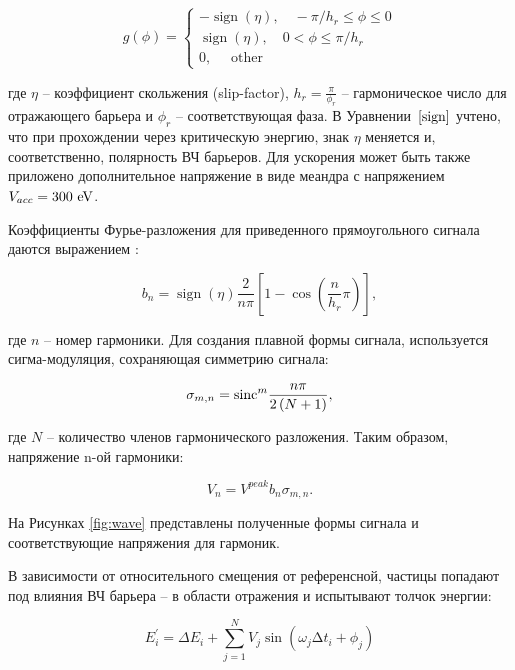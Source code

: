 \documentclass[a4paper,
               keeplastbox,   %
               ]{jacow}
\begin{document}
\begin{equation}
g(\phi)=\left\{\begin{array}{c}
-\operatorname{sign}(\eta),\quad -\pi / h_r \leq \phi \leq 0 \\
\operatorname{sign}(\eta),\quad 0<\phi \leq \pi / h_r \\
0, \quad \text { other }
\end{array}\right.
\label{sign}
\end{equation}

где $\eta$ – коэффициент скольжения (slip-factor), $h_r=\frac{\pi}{\phi_{r}}$ – гармоническое число для отражающего барьера и $\phi_{r}$ – соответствующая фаза.  В Уравнении~$\ref{sign}$ учтено, что при прохождении через критическую энергию, знак $\eta$ меняется и, соответственно, полярность ВЧ барьеров. Для ускорения может быть также приложено дополнительное напряжение в виде меандра с напряжением $V_{acc}=300~\rm{eV}$.

Коэффициенты Фурье-разложения для приведенного прямоугольного сигнала даются выражением \cite{BB_cern}:

\begin{equation}
b_n=\operatorname{sign}{\left(\eta\right)}\frac{2}{n\pi}\left[1-\cos{\left(\frac{n}{h_r}\pi\right)}\right],
\label{b}
\end{equation}

где $n$ – номер гармоники. Для создания плавной формы сигнала, используется сигма-модуляция, сохраняющая симметрию сигнала:

\begin{equation}
\sigma_{m, n}={\rm sinc}^m{\frac{n\pi}{2\left(N+1\right)}},
\label{sigma}
\end{equation}

где $N$ – количество членов гармонического разложения. Таким образом, напряжение n-ой гармоники:

\begin{equation}
V_n=V^{peak}b_n\sigma_{m, n}.
\label{Volt_n}
\end{equation}

На Рисунках \ref{fig:wave} представлены полученные формы сигнала и соответствующие напряжения для гармоник.

В зависимости от относительного смещения от референсной, частицы попадают под влияния ВЧ барьера – в области отражения и испытывают толчок энергии:

\begin{equation}
E_i^\prime=\Delta E_i+\sum_{j=1}^{N} V_j\sin{\left(\omega_{j}\mathrm{\Delta}t_i+\phi_j\right)} 
\label{dE}
\end{equation}
\end{document}
